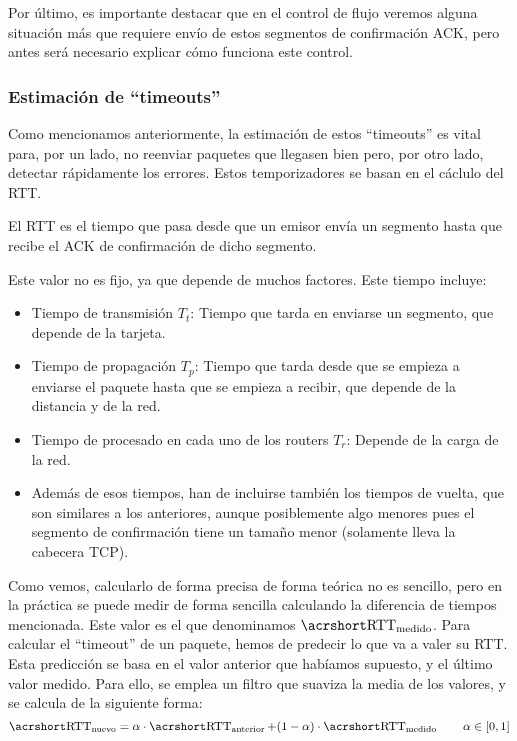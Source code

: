 Por último, es importante destacar que en el control de flujo veremos alguna situación más que requiere envío de estos segmentos de confirmación \acrshort{ACK}, pero antes será necesario explicar cómo funciona este control.

\subsubsection{Estimación de ``timeouts''}

Como mencionamos anteriormente, la estimación de estos ``timeouts'' es vital para, por un lado, no reenviar paquetes que llegasen bien pero, por otro lado, detectar rápidamente los errores. Estos temporizadores se basan en el cáclulo del \acrshort{RTT}.

\begin{definicion}
    El \acrfull{RTT} es el tiempo que pasa desde que un emisor envía un segmento hasta que recibe el \acrshort{ACK} de confirmación de dicho segmento.
\end{definicion}

Este valor no es fijo, ya que depende de muchos factores. Este tiempo incluye:
\begin{itemize}
    \item Tiempo de transmisión $T_t$: Tiempo que tarda en enviarse un segmento, que depende de la tarjeta.
    \item Tiempo de propagación $T_p$: Tiempo que tarda desde que se empieza a enviarse el paquete hasta que se empieza a recibir, que depende de la distancia y de la red.
    \item Tiempo de procesado en cada uno de los routers $T_r$: Depende de la carga de la red.
    \item Además de esos tiempos, han de incluirse también los tiempos de vuelta, que son similares a los anteriores, aunque posiblemente algo menores pues el segmento de confirmación tiene un tamaño menor (solamente lleva la cabecera \acrshort{TCP}).
\end{itemize}

Como vemos, calcularlo de forma precisa de forma teórica no es sencillo, pero en la práctica se puede medir de forma sencilla calculando la diferencia de tiempos mencionada. Este valor es el que denominamos $\rtt_{\text{medido}}$. Para calcular el ``timeout'' de un paquete, hemos de predecir lo que va a valer su \acrshort{RTT}. Esta predicción se basa en el valor anterior que habíamos supuesto, y el último valor medido. Para ello, se emplea un filtro que suaviza la media de los valores, y se calcula de la siguiente forma:
\begin{equation*}
    \rtt_{\text{nuevo}} = \alpha \cdot \rtt_{\text{anterior}} + (1-\alpha) \cdot \rtt_{\text{medido}}
    \qquad \alpha \in [0,1]
\end{equation*}

